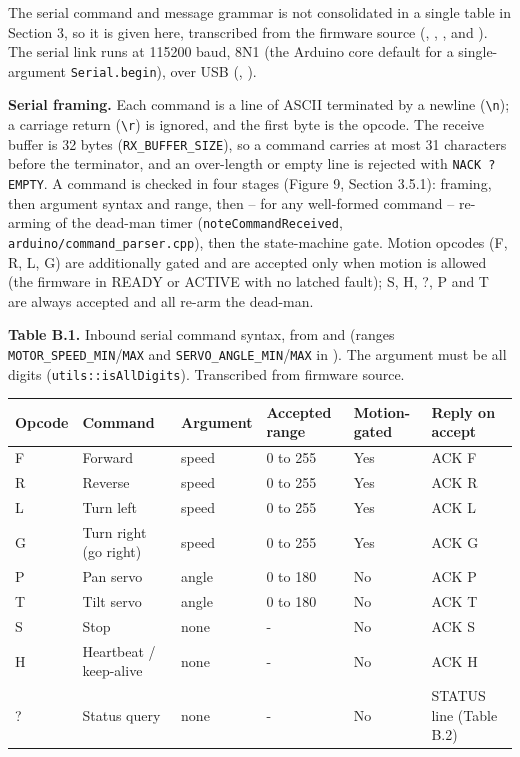 \documentclass[12pt,a4paper]{report}
\begin{document}
The serial command and message grammar is not consolidated in a single table in Section 3, so it is given here, transcribed from the firmware source (\texttt{}, \texttt{}, \texttt{}, \texttt{} and \texttt{}). The serial link runs at 115200 baud, 8N1 (the Arduino core default for a single-argument \texttt{Serial.begin}), over USB (\texttt{}, \texttt{}).

\textbf{Serial framing.} Each command is a line of ASCII terminated by a newline (\texttt{\textbackslash n}); a carriage return (\texttt{\textbackslash r}) is ignored, and the first byte is the opcode. The receive buffer is 32 bytes (\texttt{RX\_BUFFER\_SIZE}), so a command carries at most 31 characters before the terminator, and an over-length or empty line is rejected with \texttt{NACK ? EMPTY}. A command is checked in four stages (Figure 9, Section 3.5.1): framing, then argument syntax and range, then -- for any well-formed command -- re-arming of the dead-man timer (\texttt{noteCommandReceived}, \texttt{arduino/command\_parser.cpp}), then the state-machine gate. Motion opcodes (F, R, L, G) are additionally gated and are accepted only when motion is allowed (the firmware in READY or ACTIVE with no latched fault); S, H, ?, P and T are always accepted and all re-arm the dead-man.

\textbf{Table B.1.} Inbound serial command syntax, from \texttt{} and \texttt{} (ranges \texttt{MOTOR\_SPEED\_MIN}/\texttt{MAX} and \texttt{SERVO\_ANGLE\_MIN}/\texttt{MAX} in \texttt{}). The argument must be all digits (\texttt{utils::isAllDigits}). Transcribed from firmware source.

\begin{center}
\footnotesize
\begin{longtable}{|p{1.1cm}|p{2.7cm}|p{1.7cm}|p{2.2cm}|p{2.1cm}|p{3.2cm}|}
\hline
\textbf{Opcode} & \textbf{Command} & \textbf{Argument} & \textbf{Accepted range} & \textbf{Motion-gated} & \textbf{Reply on accept} \\
\hline
\endhead
F & Forward & speed & 0 to 255 & Yes & ACK F \\
\hline
R & Reverse & speed & 0 to 255 & Yes & ACK R \\
\hline
L & Turn left & speed & 0 to 255 & Yes & ACK L \\
\hline
G & Turn right (go right) & speed & 0 to 255 & Yes & ACK G \\
\hline
P & Pan servo & angle & 0 to 180 & No & ACK P \\
\hline
T & Tilt servo & angle & 0 to 180 & No & ACK T \\
\hline
S & Stop & none & - & No & ACK S \\
\hline
H & Heartbeat / keep-alive & none & - & No & ACK H \\
\hline
? & Status query & none & - & No & STATUS line (Table B.2) \\
\hline
\end{longtable}
\end{center}
\end{document}
